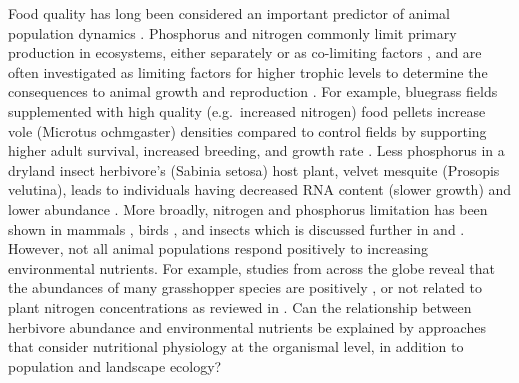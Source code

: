 \documentclass[
]{article}
\begin{document}
Food quality has long been considered an important predictor of animal
population dynamics
\citep{andersen_stoichiometry_2004, white_inadequate_1993}. Phosphorus
and nitrogen commonly limit primary production in ecosystems, either
separately or as co-limiting factors \citep[ ,
\citet{vitousek_terrestrial_2010}]{tyrrell_relative_1999}, and are often
investigated as limiting factors for higher trophic levels to determine
the consequences to animal growth and reproduction
\citep{andersen_stoichiometry_2004}. For example, bluegrass fields
supplemented with high quality (e.g.~increased nitrogen) food pellets
increase vole (Microtus ochmgaster) densities compared to control fields
by supporting higher adult survival, increased breeding, and growth rate
\citep{cole_influence_1978}. Less phosphorus in a dryland insect
herbivore's (Sabinia setosa) host plant, velvet mesquite (Prosopis
velutina), leads to individuals having decreased RNA content (slower
growth) and lower abundance \citep{schade_stoichiometric_2003}. More
broadly, nitrogen and phosphorus limitation has been shown in mammals
\citep{randolph_nutritional_1995, white_inadequate_1993}, birds
\citep{forero_conspecific_2002, granbom_food_2006}, and insects
\citep{floyd_frontiers_1996, huberty_consequences_2006, marsh_decline_1995, perkins_dietary_2004}
which is discussed further in \citet{white_role_2008} and
\citet{andersen_stoichiometry_2004}. However, not all animal populations
respond positively to increasing environmental nutrients. For example,
studies from across the globe reveal that the abundances of many
grasshopper species are positively
\citep{joern_not_2012, ozment_tracking_2021, welti_bottomup_2020, welti_nutrient_2020, zhu_effects_2020, zhu_negative_2019},
or not related
\citep{heidorn_feeding_1987, jonas_hostplant_2008, lenhart_water_2015, ozment_tracking_2021}
to plant nitrogen concentrations as reviewed in \citet{cease_how_2024}.
Can the relationship between herbivore abundance and environmental
nutrients be explained by approaches that consider nutritional
physiology at the organismal level, in addition to population and
landscape ecology?
\end{document}
